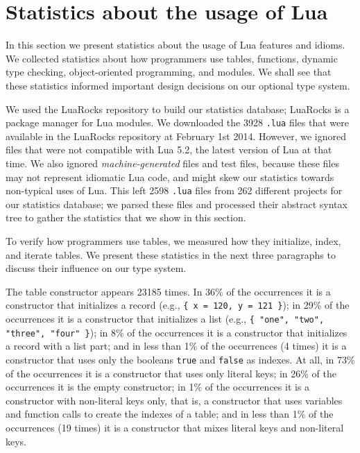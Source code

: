 \section{Statistics about the usage of Lua}
\label{sec:statistics}

In this section we present statistics about the usage of Lua
features and idioms.
We collected statistics about how programmers use tables, functions,
dynamic type checking, object-oriented programming, and modules.
We shall see that these statistics informed important design decisions
on our optional type system.

We used the LuaRocks repository to build our statistics database;
LuaRocks \cite{hisham2013luarocks} is a package manager for Lua
modules.
We downloaded the 3928 \texttt{.lua} files that were available in
the LuaRocks repository at February 1st 2014.
However, we ignored files that were not compatible with Lua 5.2,
the latest version of Lua at that time.
We also ignored \emph{machine-generated} files and test files,
because these files may not represent idiomatic Lua code,
and might skew our statistics towards non-typical uses of Lua.
This left 2598 \texttt{.lua} files from 262 different projects for
our statistics database;
we parsed these files and processed their abstract syntax tree
to gather the statistics that we show in this section.

To verify how programmers use tables, we measured how they
initialize, index, and iterate tables.
We present these statistics in the next three paragraphs to discuss
their influence on our type system.

The table constructor appears 23185 times.
In 36\% of the occurrences it is a constructor that initializes a
record (e.g., \texttt{\{ x = 120, y = 121 \}});
in 29\% of the occurrences it is a constructor that initializes a
list (e.g., \texttt{\{ "one", "two", "three", "four" \}});
in 8\% of the occurrences it is a constructor that initializes a
record with a list part;
and in less than 1\% of the occurrences (4 times) it is a constructor
that uses only the booleans \texttt{true} and \texttt{false} as indexes.
At all, in 73\% of the occurrences it is a constructor that uses
only literal keys;
in 26\% of the occurrences it is the empty constructor;
in 1\% of the occurrences it is a constructor with non-literal keys
only, that is, a constructor that uses variables and function calls
to create the indexes of a table;
and in less than 1\% of the occurrences (19 times) it is a constructor
that mixes literal keys and non-literal keys.


